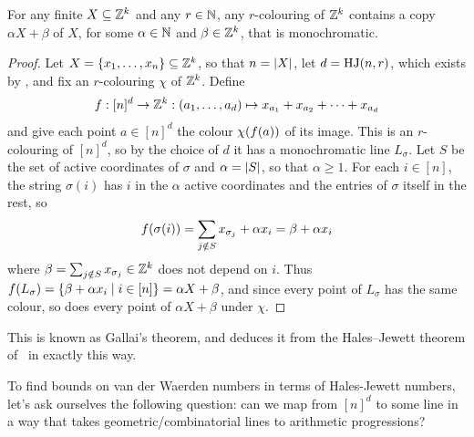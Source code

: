 \begin{boxtheorem}
    For any finite $X \subseteq \mathbb{Z}^k$ and any $r \in \mathbb{N}$, any $r$-colouring of $\mathbb{Z}^k$ contains a copy $\alpha X + \beta$ of $X$, for some $\alpha \in \mathbb{N}$ and $\beta \in \mathbb{Z}^k$, that is monochromatic.
\end{boxtheorem}
\begin{proof}
    Let $X = \left\{ x_1, \ldots, x_n \right\} \subseteq \mathbb{Z}^k$, so that $n = \left\lvert X \right\rvert$, let $d = \operatorname{HJ}(n, r)$, which exists by , and fix an $r$-colouring $\chi$ of $\mathbb{Z}^k$. Define
    \begin{align*}
        f : [n]^d \to \mathbb{Z}^k : \left( a_1, \ldots, a_d \right) \mapsto x_{a_1} + x_{a_2} + \cdots + x_{a_d}
    \end{align*}
    and give each point $a \in [n]^d$ the colour $\chi\!\left( f(a) \right)$ of its image. This is an $r$-colouring of $[n]^d$, so by the choice of $d$ it has a monochromatic line $L_\sigma$. Let $S$ be the set of active coordinates of $\sigma$ and $\alpha = \left\lvert S \right\rvert$, so that $\alpha \geq 1$. For each $i \in [n]$, the string $\sigma(i)$ has $i$ in the $\alpha$ active coordinates and the entries of $\sigma$ itself in the rest, so
    \begin{align*}
        f\!\left( \sigma(i) \right) = \sum_{j \notin S} x_{\sigma_j} + \alpha x_i = \beta + \alpha x_i
    \end{align*}
    where $\beta = \sum_{j \notin S} x_{\sigma_j} \in \mathbb{Z}^k$ does not depend on $i$. Thus $f\!\left( L_\sigma \right) = \left\{ \beta + \alpha x_i \; \middle\vert \; i \in [n] \right\} = \alpha X + \beta$, and since every point of $L_\sigma$ has the same colour, so does every point of $\alpha X + \beta$ under $\chi$.
\end{proof}

This is known as Gallai's theorem, and \cite[Chapter~2]{GrahamRothschildSpencer} deduces it from the Hales--Jewett theorem of~\cite{HalesJewett} in exactly this way.

To find bounds on van der Waerden numbers in terms of Hales-Jewett numbers, let's ask ourselves the following question: can we map from $[n]^d$ to some line in a way that takes geometric/combinatorial lines to arithmetic progressions?

